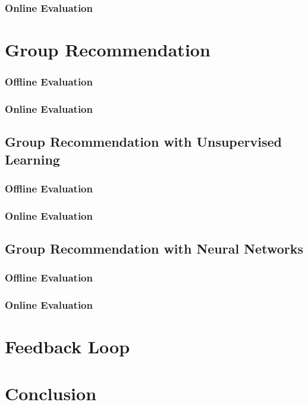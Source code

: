 \subsubsection{Online Evaluation}

\section{Group Recommendation}

\subsubsection{Offline Evaluation}

\subsubsection{Online Evaluation}

\subsection{Group Recommendation with Unsupervised Learning}

\subsubsection{Offline Evaluation}

\subsubsection{Online Evaluation}

\subsection{Group Recommendation with Neural Networks}

\subsubsection{Offline Evaluation}

\subsubsection{Online Evaluation}

\section{Feedback Loop}


\section{Conclusion}
